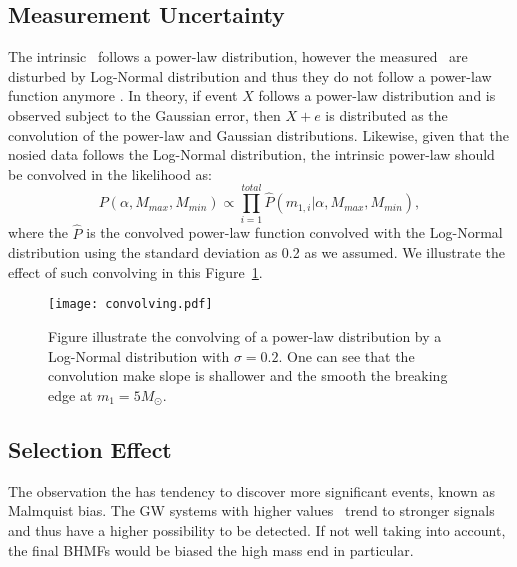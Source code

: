 \documentclass[twocolumn]{aastex62}
\begin{document}
\subsection{Measurement Uncertainty}\label{sec_likelihood_noise}
The intrinsic \mone\ follows a power-law distribution, however the measured  \mone\ are disturbed by Log-Normal distribution and thus they do not follow a power-law function anymore \citep{Koen2009}. In theory, if event $X$ follows a power-law distribution and is observed subject to the Gaussian error, then $X + e$ is distributed as the convolution of the power-law and Gaussian distributions. Likewise, given that the nosied data follows the Log-Normal distribution, the intrinsic power-law should be convolved in the likelihood as:
 \begin{equation} \label{equ_lik_conv}
 P(\alpha, M_{max}, M_{min}) \propto  \prod_{i=1}^{total} \hat{P}(m_{1,i}|\alpha, M_{max}, M_{min}),
 \end{equation}
where the $\hat{P}$ is the convolved power-law function convolved with the Log-Normal distribution using the standard deviation as 0.2 as we assumed. We illustrate the effect of such convolving in this Figure~\ref{fig:result_slope}.

\begin{figure}%
\texttt{[image: convolving.pdf]}
\caption{
Figure illustrate the convolving of a power-law distribution by a Log-Normal distribution with $\sigma = 0.2$. One can see that the convolution make slope is shallower and the smooth the breaking edge at $m_1 = 5 M_{\odot}$.
}
\label{fig:result_slope}
\end{figure}

\subsection{Selection Effect}\label{sec_likelihood_sf}
The observation the has tendency to discover more significant events, known as Malmquist bias. The GW systems with higher values \mone\ trend to stronger signals and thus have a higher possibility to be detected. If not well taking into account, the final BHMFs would be biased the high mass end in particular.
\end{document}
